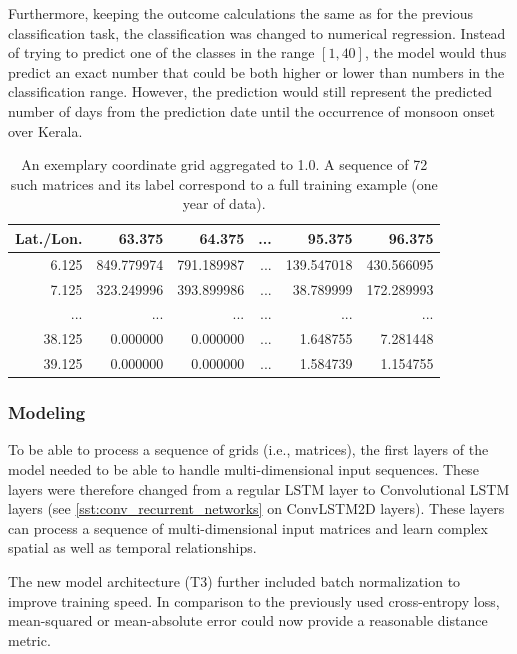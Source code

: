 Furthermore, keeping the outcome calculations the same as for the previous classification task, the classification was changed to numerical regression. Instead of trying to predict one of the classes in the range $\left[ 1, 40 \right]$, the model would thus predict an exact number that could be both higher or lower than numbers in the classification range. However, the prediction would still represent the predicted number of days from the prediction date until the occurrence of monsoon onset over Kerala.

\begin{table}[h]
  \centering
  \begin{tabular}{|r||rrrrr|}
    \hline
    Lat./Lon. & 63.375 & 64.375 & ... & 95.375 & 96.375 \\
    \hline
    \hline
    6.125 & 849.779974 & 791.189987 & ... & 139.547018 & 430.566095 \\
    7.125 & 323.249996 & 393.899986 & ... & 38.789999 & 172.289993 \\
    ... & ... & ... & ... & ... & ...\\
    38.125 & 0.000000 & 0.000000 & ... & 1.648755 & 7.281448 \\
    39.125 & 0.000000 & 0.000000 & ... & 1.584739 & 1.154755 \\
    \hline
  \end{tabular}
  \caption{An exemplary coordinate grid aggregated to 1.0\degree. A sequence of 72 such matrices and its label correspond to a full training example (one year of data).}
  \label{tab:nn_t3_data}
\end{table}

\subsubsection{Modeling}
\label{ssst:nn_t3_model}
To be able to process a sequence of grids (i.e., matrices), the first layers of the model needed to be able to handle multi-dimensional input sequences. These layers were therefore changed from a regular LSTM layer to Convolutional LSTM layers (see \cref{sst:conv_recurrent_networks} on ConvLSTM2D layers). These layers can process a sequence of multi-dimensional input matrices and learn complex spatial as well as temporal relationships.

The new model architecture (T3) further included batch normalization to improve training speed. In comparison to the previously used cross-entropy loss, mean-squared or mean-absolute error could now provide a reasonable distance metric.


